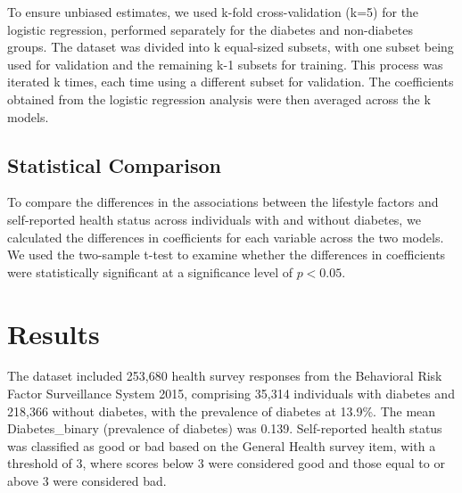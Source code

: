 \documentclass[12pt]{article}
\begin{document}
To ensure unbiased estimates, we used k-fold cross-validation (k=5) for the logistic regression, performed separately for the diabetes and non-diabetes groups. The dataset was divided into k equal-sized subsets, with one subset being used for validation and the remaining k-1 subsets for training. This process was iterated k times, each time using a different subset for validation. The coefficients obtained from the logistic regression analysis were then averaged across the k models.

\subsection{Statistical Comparison}
To compare the differences in the associations between the lifestyle factors and self-reported health status across individuals with and without diabetes, we calculated the differences in coefficients for each variable across the two models. We used the two-sample t-test to examine whether the differences in coefficients were statistically significant at a significance level of \(p<0.05\).



\section{Results}

The dataset included 253,680 health survey responses from the Behavioral Risk Factor Surveillance System 2015, comprising 35,314 individuals with diabetes and 218,366 without diabetes, with the prevalence of diabetes at 13.9\%. The mean Diabetes\_binary (prevalence of diabetes) was 0.139. Self-reported health status was classified as good or bad based on the General Health survey item, with a threshold of 3, where scores below 3 were considered good and those equal to or above 3 were considered bad.
\end{document}
